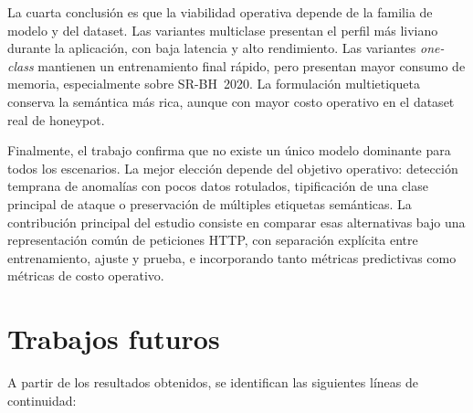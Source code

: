 \documentclass[12pt,oneside]{report}
\begin{document}
La cuarta conclusión es que la viabilidad operativa depende de la familia de modelo y del dataset. Las variantes multiclase presentan el perfil más liviano durante la aplicación, con baja latencia y alto rendimiento. Las variantes \textit{one-class} mantienen un entrenamiento final rápido, pero presentan mayor consumo de memoria, especialmente sobre SR-BH~2020. La formulación multietiqueta conserva la semántica más rica, aunque con mayor costo operativo en el dataset real de honeypot.

Finalmente, el trabajo confirma que no existe un único modelo dominante para todos los escenarios. La mejor elección depende del objetivo operativo: detección temprana de anomalías con pocos datos rotulados, tipificación de una clase principal de ataque o preservación de múltiples etiquetas semánticas. La contribución principal del estudio consiste en comparar esas alternativas bajo una representación común de peticiones HTTP, con separación explícita entre entrenamiento, ajuste y prueba, e incorporando tanto métricas predictivas como métricas de costo operativo.

\chapter{Trabajos futuros}

A partir de los resultados obtenidos, se identifican las siguientes líneas de continuidad:
\end{document}
